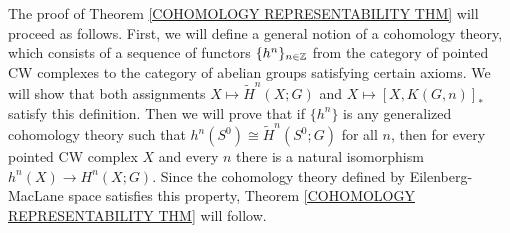 The proof of Theorem \ref{COHOMOLOGY REPRESENTABILITY THM} will proceed as follows. 
First, we will define a general notion of a cohomology theory, which 
consists of a sequence of functors $\{ h^{n} \}_{n\in {\mathbb Z}}$ from the category 
of pointed CW complexes to the category of abelian groups satisfying certain axioms.
We will show that both assignments $X \mapsto \widetilde{H}^{n}(X; G)$ and 
$X \mapsto [X, K(G, n)]_{\ast}$ satisfy this definition. Then
we will prove that if $\{h^{n}\}$ is any generalized cohomology 
theory such that $h^{n}(S^{0})\cong \widetilde{H}^{n}(S^{0} ; G)$ for all $n$, 
then for every pointed CW complex $X$ and every $n$ there is a natural isomorphism 
$h^{n}(X) \to H^{n}(X; G)$. Since the cohomology theory defined by Eilenberg-MacLane
space satisfies this property, Theorem \ref{COHOMOLOGY REPRESENTABILITY THM} will follow.   



